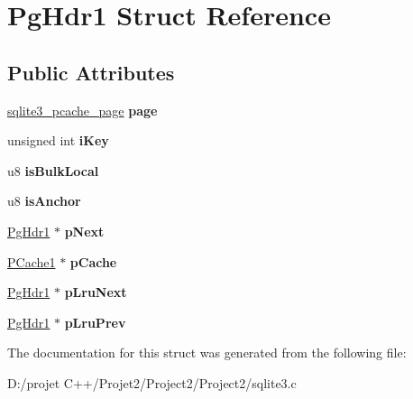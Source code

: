 \hypertarget{struct_pg_hdr1}{}\section{Pg\+Hdr1 Struct Reference}
\label{struct_pg_hdr1}
\subsection*{Public Attributes}
\begin{DoxyCompactItemize}
\item 
\mbox{\label{struct_pg_hdr1_a121a9abbfea6b112ba77eeb84391ed47}} 
\mbox{\hyperlink{structsqlite3__pcache__page}{sqlite3\+\_\+pcache\+\_\+page}} {\bfseries page}
\item 
\mbox{\label{struct_pg_hdr1_ad122ef74f5f0137414882aabd111a01b}} 
unsigned int {\bfseries i\+Key}
\item 
\mbox{\label{struct_pg_hdr1_a1c07bb6fab410b7c9f41b24c44a118de}} 
u8 {\bfseries is\+Bulk\+Local}
\item 
\mbox{\label{struct_pg_hdr1_a232f677ac68bc8fbb7685e8a1955c810}} 
u8 {\bfseries is\+Anchor}
\item 
\mbox{\label{struct_pg_hdr1_acde43ab0ed0fbba33e526058d9c343b9}} 
\mbox{\hyperlink{struct_pg_hdr1}{Pg\+Hdr1}} $\ast$ {\bfseries p\+Next}
\item 
\mbox{\label{struct_pg_hdr1_aa5b23de466773e72e1b6edf07b3a4570}} 
\mbox{\hyperlink{struct_p_cache1}{P\+Cache1}} $\ast$ {\bfseries p\+Cache}
\item 
\mbox{\label{struct_pg_hdr1_ae22cfc3a39fe029a8f8fdd70e7ca4055}} 
\mbox{\hyperlink{struct_pg_hdr1}{Pg\+Hdr1}} $\ast$ {\bfseries p\+Lru\+Next}
\item 
\mbox{\label{struct_pg_hdr1_adf220ef63d6ceb782ac87a08aeb1722d}} 
\mbox{\hyperlink{struct_pg_hdr1}{Pg\+Hdr1}} $\ast$ {\bfseries p\+Lru\+Prev}
\end{DoxyCompactItemize}


The documentation for this struct was generated from the following file\+:\begin{DoxyCompactItemize}
\item 
D\+:/projet C++/\+Projet2/\+Project2/\+Project2/sqlite3.\+c\end{DoxyCompactItemize}
